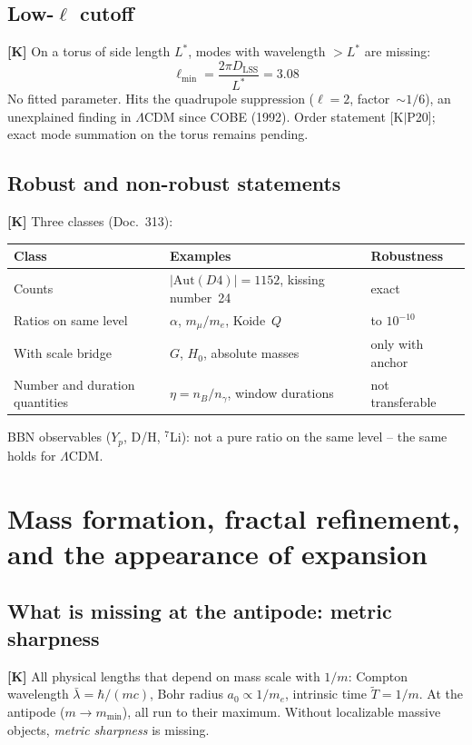 \subsection{Low-$\ell$ cutoff}

\textbf{[K]} On a torus of side length $L^*$, modes with
wavelength $> L^*$ are missing:
\[
\ell_\text{min} = \frac{2\pi D_\text{LSS}}{L^*} = 3.08
\]
No fitted parameter. Hits the quadrupole suppression
($\ell = 2$, factor~$\sim 1/6$), an unexplained finding in
$\Lambda$CDM since COBE (1992). Order statement [K$|$P20]; exact
mode summation on the torus remains pending.

\subsection{Robust and non-robust statements}

\textbf{[K]} Three classes (Doc.~313):

\begin{center}
	\small
	\begin{tabular}{p{3.2cm}p{4cm}p{3cm}}
		\toprule
		Class & Examples & Robustness \\
		\midrule
		Counts & $|\text{Aut}(D4)| = 1152$, kissing number~24 & exact \\
		Ratios on same level & $\alpha$, $m_\mu/m_e$, Koide~$Q$ &
		to $10^{-10}$ \\
		With scale bridge & $G$, $H_0$, absolute masses & only with anchor \\
		Number and duration quantities & $\eta = n_B/n_\gamma$, window durations &
		not transferable \\
		\bottomrule
	\end{tabular}
\end{center}

BBN observables ($Y_p$, D/H, ${}^7$Li): not a pure ratio
on the same level -- the same holds for $\Lambda$CDM.

\section{Mass formation, fractal refinement, and the appearance of expansion}

\subsection{What is missing at the antipode: metric sharpness}

\textbf{[K]} All physical lengths that depend on mass scale
with $1/m$: Compton wavelength $\bar\lambda = \hbar/(mc)$,
Bohr radius $a_0 \propto 1/m_e$, intrinsic time $\tilde{T} = 1/m$.
At the antipode ($m \to m_\text{min}$), all run to their maximum.
Without localizable massive objects, \emph{metric sharpness} is missing.

